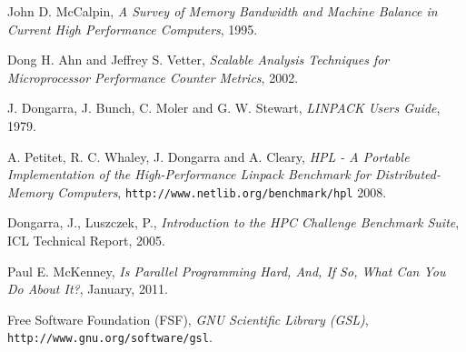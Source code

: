 \documentclass[a4paper]{report}
\begin{document}
\begin{thebibliography}{9}
  John D. McCalpin,
  \emph{A Survey of Memory Bandwidth and Machine Balance in Current High
    Performance Computers},
  1995.
  
  Dong H. Ahn and Jeffrey S. Vetter,
  \emph{Scalable Analysis Techniques for Microprocessor Performance Counter
    Metrics},
  2002.
  
  J. Dongarra, J. Bunch, C. Moler and G. W. Stewart, 
  \emph{LINPACK Users Guide},
  1979.
  
  A. Petitet, R. C. Whaley, J. Dongarra and A. Cleary, 
  \emph{HPL - A Portable Implementation of the High-Performance Linpack
    Benchmark for Distributed-Memory Computers}, {\tt http://www.netlib.org/benchmark/hpl}
  2008.

  Dongarra, J., Luszczek, P.,
  \emph{Introduction to the HPC Challenge Benchmark Suite}, ICL Technical Report,
  2005.  
  
  Paul E. McKenney,
  \emph{Is Parallel Programming Hard, And, If So, What Can You Do About It?},
  January, 2011.

  Free Software Foundation (FSF), \emph{GNU Scientific Library (GSL)},
  {\tt http://www.gnu.org/software/gsl}.

\end{thebibliography}
\end{document}
